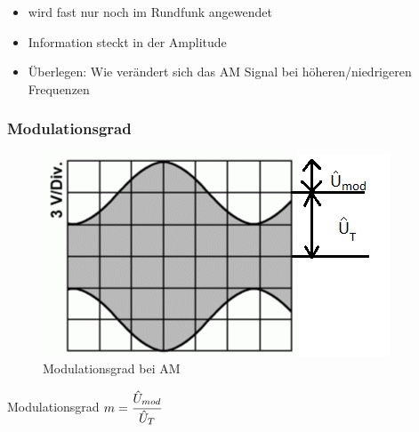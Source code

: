 \begin{frame}
\begin{minipage}{0.3\textwidth}
\begin{figure}
    \end{figure}
\end{minipage}
\hspace{0.5cm}
\begin{minipage}{0.5\textwidth}	
	\begin{itemize}
		\item wird fast nur noch im Rundfunk angewendet
		\item Information steckt in der Amplitude
        \item Überlegen: Wie verändert sich das AM Signal bei höheren/niedrigeren Frequenzen
	\end{itemize}
\end{minipage}
\end{frame}

\begin{frame}
\frametitle{Modulationsgrad}
\begin{center}
   \begin{figure}
      \includegraphics[width=\textwidth,height=.75\textheight,keepaspectratio]{e14/TE103.png}
      \caption{Modulationsgrad bei AM}
    \end{figure}


\hspace{0.5cm}

\begin{block}{Modulationsgrad}
  $m = \cfrac{\hat{U}_{mod}}{\hat{U}_T}$
\end{block}
\end{center}
\end{frame}

